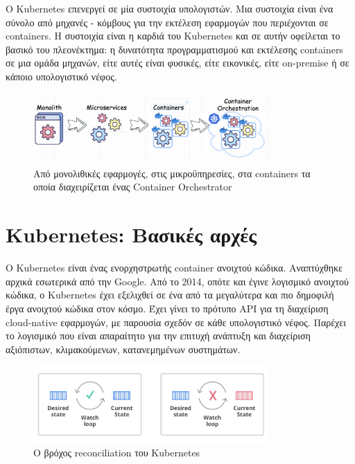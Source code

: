 Ο Kubernetes επενεργεί σε μία συστοιχία υπολογιστών. Μια συστοιχία είναι ένα
σύνολο από μηχανές - κόμβους για την εκτέλεση εφαρμογών που περιέχονται σε
containers. Η συστοιχία είναι η καρδιά του Kubernetes και σε αυτήν οφείλεται το
βασικό του πλεονέκτημα: η δυνατότητα προγραμματισμού και εκτέλεσης containers σε
μια ομάδα μηχανών, είτε αυτές είναι φυσικές, είτε εικονικές, είτε on-premise ή
σε κάποιο υπολογιστικό νέφος.

\begin{figure}
      \centering
      \includegraphics[width=0.8\textwidth]{resources/containerization.png}
      \caption{Από μονολιθικές εφαρμογές, στις μικροϋπηρεσίες, στα containers τα οποία διαχειρίζεται ένας Container Orchestrator}
\end{figure}

\section{Kubernetes: Βασικές αρχές}
Ο Kubernetes είναι ένας ενορχηστρωτής container ανοιχτού κώδικα. Αναπτύχθηκε
αρχικά εσωτερικά από την Google. Από το 2014, οπότε και έγινε λογισμικό ανοιχτού
κώδικα, ο Kubernetes έχει εξελιχθεί σε ένα από τα μεγαλύτερα και πιο δημοφιλή
έργα ανοιχτού κώδικα στον κόσμο. Έχει γίνει το πρότυπο API για τη διαχείριση
cloud-native εφαρμογών, με παρουσία σχεδόν σε κάθε υπολογιστικό νέφος.  Παρέχει
το λογισμικό που είναι απαραίτητο για την επιτυχή ανάπτυξη και διαχείριση
αξιόπιστων, κλιμακούμενων, κατανεμημένων συστημάτων.

\begin{figure}
      \centering
      \includegraphics[width=0.8\textwidth]{resources/declarative.jpg}
      \caption{Ο βρόχος reconciliation του Kubernetes}
\end{figure}


